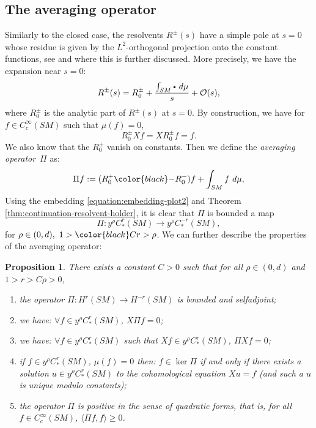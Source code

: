 \documentclass[JEP,XML,SOM,Unicode,NoFloatCountersInSection]{cedram}
\newcommand{\sbullet}{{\scriptscriptstyle\bullet}}
\newcommand{\csbullet}{{\raisebox{1pt}{$\sbullet$}}}
\newcommand{\mc}{\mathcal}
\theoremstyle{plain}
\newtheorem{proposition}{Proposition}[section]
\theoremstyle{definition}
\begin{document}
\subsection{The averaging operator}

\label{ssection:averaging}

Similarly to the closed case, the resolvents $R^\pm(s)$ have a simple pole at $s=0$ whose residue is given by the $L^2$-orthogonal projection onto the constant functions, see \cite[\S 2]{Guillarmou-17-1} and \cite[\S\S 5.1 \& 5.2]{Cekic-Lefeuvre-20} where this is further discussed. More precisely, we have the expansion near $s=0$:
\[
R^\pm(s) = R^\pm_0 + \dfrac{\int_{SM} \csbullet ~d \mu}{s} + \mc{O}(s),
\]
where $R_0^\pm$ is the analytic part of $R^\pm(s)$ at $s=0$. By construction, we have for $f\in C^\infty_c(SM)$ such that $\mu(f) = 0$,
\[
R_0^\pm X f = X R_0^\pm f = f.
\]
We also know that the $R_0^\pm$ vanish on constants. Then we define the \emph{averaging operator}~$\Pi$ as:
\begin{equation}
\label{equation:pi}
\Pi f := (R_0^+ {\color{black}-} R_0^-)f + \int_{SM} f ~d \mu,
\end{equation}
Using the embedding \eqref{equation:embedding-plot2} and Theorem \ref{thm:continuation-resolvent-holder}, it is clear that $\Pi$ is bounded a map
\begin{equation}
\label{equation:pi-bound}
\Pi : y^\rho C^r_*(SM) \to y^\rho C^{-r}_*(SM),
\end{equation}
for $\rho \in (0,d),\ 1> {\color{black}C}r > \rho$. We can further describe the properties of the averaging operator:
\begin{proposition}
\label{proposition:pi}
There exists a constant $C>0$ such that for all $\rho \in (0,d)$ and $1> r > C\rho >0$,
\begin{enumerate}
\item\label{proposition:pi1} the operator $\Pi : H^r(SM) \to H^{-r}(SM)$ is bounded and selfadjoint;
\item\label{proposition:pi2} we have: $\forall f \in y^\rho C^r_*(SM)$, $X \Pi f = 0$;
\item\label{proposition:pi3} we have: $\forall f \in y^\rho C^r_*(SM)$ such that $Xf\in y^\rho C^r_*(SM)$, $\Pi X f = 0$;
\item\label{proposition:pi4} if $f \in y^\rho C^r_*(SM)$, $\mu(f) =0$ then: $f \in \ker \Pi$ if and only if there exists a solution $u \in y^\rho C^r_*(SM)$ to the cohomological equation $X u = f$ (and such a $u$ is unique modulo constants);
\item\label{proposition:pi5} the operator $\Pi$ is positive in the sense of quadratic forms, that is, for all $f \in C^\infty_c(SM)$, $\langle \Pi f , f \rangle \geq 0$.
\end{enumerate}
\end{proposition}
\end{document}
